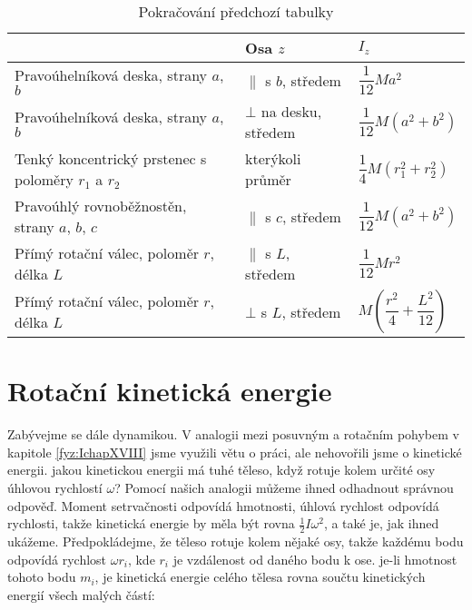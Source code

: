     \begin{table*}
      \centering
      \setlength{\tabcolsep}{2pt}
      \begin{tabular}{|l|l|l|}
        \hline
        \rowcolor{CornflowerBlue}{těleso} & {Osa \(z\)} & \(I_z\)                  \\
        \hline
        Pravoúhelníková deska, strany \(a\), \(b\)
          & \(\parallel\) s \(b\), středem & \(\dfrac{1}{12}Ma^2\)                 \\
        \hline 
        Pravoúhelníková deska, strany \(a\), \(b\)  
          & \(\bot\) na desku, středem & \(\dfrac{1}{12}M(a^2 + b^2)\)             \\
        \hline 
        Tenký koncentrický prstenec s poloměry \(r_1\) a \(r_2\)  
          &  kterýkoli průměr  & \(\dfrac{1}{4}M(r_1^2 + r_2^2)\)                  \\
        \hline 
        Pravoúhlý rovnoběžnostěn, strany \(a\), \(b\), \(c\)  
          & \(\parallel\) s \(c\), středem & \(\dfrac{1}{12}M(a^2 + b^2)\)                                \\
        \hline 
        Přímý rotační válec, poloměr \(r\), délka \(L\) 
          & \(\parallel\) s \(L\), středem & \(\dfrac{1}{12}Mr^2\)                                          \\
        \hline
        Přímý rotační válec, poloměr \(r\), délka \(L\) 
          & \(\bot\) s \(L\), středem & \(M\left(\dfrac{r^2}{4} + \dfrac{L^2}{12}\right)\)                                          \\
        \hline 
      \end{tabular}
      \caption{Pokračování předchozí tabulky}\label{fyz:tab014}
    \end{table*}

  \section{Rotační kinetická energie}\label{fyz:IchapXIXsecIV}
    Zabývejme se dále dynamikou. V analogii mezi posuvným a rotačním pohybem v kapitole
    \ref{fyz:IchapXVIII} jsme využili větu o práci, ale nehovořili jsme o kinetické energii. jakou
    kinetickou energii má tuhé těleso, když rotuje kolem určité osy úhlovou rychlostí \(\omega\)?
    Pomocí našich analogii můžeme ihned odhadnout správnou odpověď. Moment setrvačnosti odpovídá
    hmotnosti, úhlová rychlost odpovídá rychlosti, takže kinetická energie by měla být rovna
    \(\frac{1}{2}Iω^2\), a také je, jak ihned ukážeme. Předpokládejme, že těleso rotuje kolem nějaké
    osy, takže každému bodu odpovídá rychlost \(ωr_i\), kde \(r_i\) je vzdálenost od daného bodu k
    ose. je-li hmotnost tohoto bodu \(m_i\), je kinetická energie celého tělesa rovna součtu
    kinetických energií všech malých částí:
  
